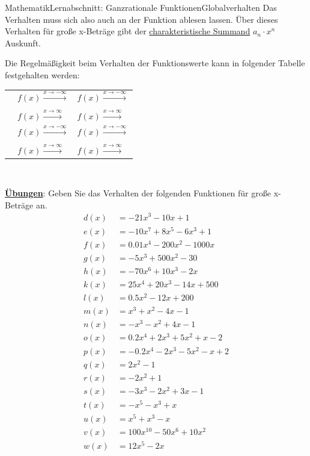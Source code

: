 \documentclass[11pt,twocolumn,oneside,openany,headings=optiontotoc,11pt,numbers=noenddot]{article}
\begin{document}
\begin{worksheet}{Mathematik}{Lernabschnitt: Ganzrationale Funktionen}{Globalverhalten}
		Das Verhalten muss sich also auch an der Funktion ablesen lassen. Über dieses Verhalten für große x-Beträge gibt der \underline{charakteristische Summand} \(a_n\cdot{}x^n\) Auskunft.\\
		\par\noindent
		Die Regelmäßigkeit beim Verhalten der Funktionswerte kann in folgender Tabelle festgehalten werden:\\
		\begin{tabular}{|l|L{0.2\textwidth}|L{0.15\textwidth}|}
			\hline
			 & & \\
			\hline
			& \(f(x) \xrightarrow{x \rightarrow -\infty}\) & \(f(x) \xrightarrow{x \rightarrow -\infty}\)\\
			& & \\
			& \(f(x) \xrightarrow{x \rightarrow \infty} \) & \(f(x) \xrightarrow{x \rightarrow \infty} \)\\
			\hline
			& \(f(x) \xrightarrow{x \rightarrow -\infty}\) & \(f(x) \xrightarrow{x \rightarrow -\infty}\)\\
			& & \\
			& \(f(x) \xrightarrow{x \rightarrow \infty} \) & \(f(x) \xrightarrow{x \rightarrow \infty} \)\\
			\hline
		\end{tabular}\\
		\par\noindent
		\textbf{\underline{Übungen}}: Geben Sie das Verhalten der folgenden Funktionen für große x-Beträge an.
		\begin{align*}
			d(x) & = -21x^{3} - 10x + 1 \\
			e(x) & = -10x^{7} + 8x^{5} - 6x^{3} + 1\\
			f(x) & = 0.01x^{4} - 200x^{2} - 1000x\\
			g(x) & = -5x^{3} + 500x^{2} - 30\\
			h(x) & = -70x^{6} + 10x^{3} - 2x\\
			k(x) & = 25x^{4} + 20x^{3} - 14x + 500\\
			l(x) & = 0.5x^{2} - 12x + 200\\
			m(x) & = x^{3} + x^{2} - 4x - 1\\
			n(x) & = -x^{3} - x^{2} + 4x - 1\\
			o(x) & = 0.2x^{4} + 2x^{3} + 5x^{2} + x - 2\\
			p(x) & = -0.2x^{4} - 2x^{3} - 5x^{2} - x + 2\\
			q(x) & = 2x^{2} - 1\\
			r(x) & = -2x^{2} + 1\\
			s(x) & = -3x^{3} - 2x^{2} + 3x - 1\\
			t(x) & = -x^{5} - x^{3} + x\\
			u(x) & = x^{5} + x^{3} - x\\
			v(x) & = 100x^{10} - 50x^{6} + 10x^{2}\\
			w(x) & = 12x^{5} - 2x
		\end{align*}
	\end{worksheet}
\end{document}
